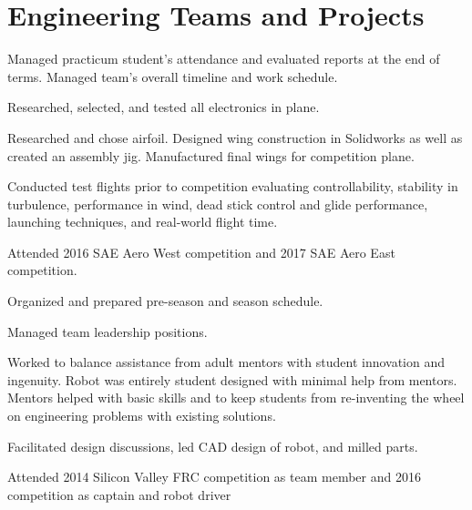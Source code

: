 \documentclass[]{deedy-resume-openfont}
\begin{document}
\section{Engineering Teams and Projects}
\begin{tightemize}
\item Managed practicum student's attendance and evaluated reports at the end of terms. Managed team's overall timeline and work schedule.
\item Researched, selected, and tested all electronics in plane.
\item Researched and chose airfoil. Designed wing construction in Solidworks as well as created an assembly jig. Manufactured final wings for competition plane.
\item Conducted test flights prior to competition evaluating controllability, stability in turbulence, performance in wind, dead stick control and glide performance, launching techniques, and real-world flight time.
\item Attended 2016 SAE Aero West competition and 2017 SAE Aero East competition.
\end{tightemize}
\sectionsep


\begin{tightemize}
\item Organized and prepared pre-season and season schedule. 
\item Managed team leadership positions.
\item Worked to balance assistance from adult mentors with student innovation and ingenuity. Robot was entirely student designed with minimal help from mentors. Mentors helped with basic skills and to keep students from re-inventing the wheel on engineering problems with existing solutions.
\item Facilitated design discussions, led CAD design of robot, and milled parts. 
\item Attended 2014 Silicon Valley FRC competition as team member and 2016 competition as captain and robot driver
\end{tightemize}
\sectionsep



\end{document}

